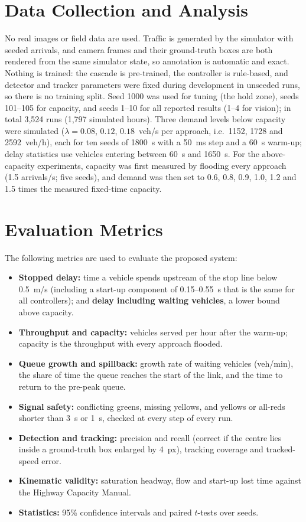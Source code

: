 \section{Data Collection and Analysis}
No real images or field data are used. Traffic is generated by the simulator with seeded arrivals, and camera frames and their ground-truth boxes are both rendered from the same simulator state, so annotation is automatic and exact. Nothing is trained: the cascade is pre-trained, the controller is rule-based, and detector and tracker parameters were fixed during development in unseeded runs, so there is no training split. Seed 1000 was used for tuning (the hold zone), seeds 101--105 for capacity, and seeds 1--10 for all reported results (1--4 for vision); in total 3,524 runs (1,797 simulated hours). Three demand levels below capacity were simulated ($\lambda = 0.08$, $0.12$, $0.18$~veh/s per approach, i.e.\ 1152, 1728 and 2592~veh/h), each for ten seeds of 1800~s with a 50~ms step and a 60~s warm-up; delay statistics use vehicles entering between 60~s and 1650~s. For the above-capacity experiments, capacity was first measured by flooding every approach (1.5 arrivals/s; five seeds), and demand was then set to 0.6, 0.8, 0.9, 1.0, 1.2 and 1.5 times the measured fixed-time capacity.

\section{Evaluation Metrics}
The following metrics are used to evaluate the proposed system:
\begin{itemize}
  \item \textbf{Stopped delay:} time a vehicle spends upstream of the stop line below 0.5~m/s (including a start-up component of 0.15--0.55~s that is the same for all controllers); and \textbf{delay including waiting vehicles}, a lower bound above capacity.
  \item \textbf{Throughput and capacity:} vehicles served per hour after the warm-up; capacity is the throughput with every approach flooded.
  \item \textbf{Queue growth and spillback:} growth rate of waiting vehicles (veh/min), the share of time the queue reaches the start of the link, and the time to return to the pre-peak queue.
  \item \textbf{Signal safety:} conflicting greens, missing yellows, and yellows or all-reds shorter than 3~s or 1~s, checked at every step of every run.
  \item \textbf{Detection and tracking:} precision and recall (correct if the centre lies inside a ground-truth box enlarged by 4~px), tracking coverage and tracked-speed error.
  \item \textbf{Kinematic validity:} saturation headway, flow and start-up lost time against the Highway Capacity Manual.
  \item \textbf{Statistics:} 95\% confidence intervals and paired $t$-tests over seeds.
\end{itemize}
